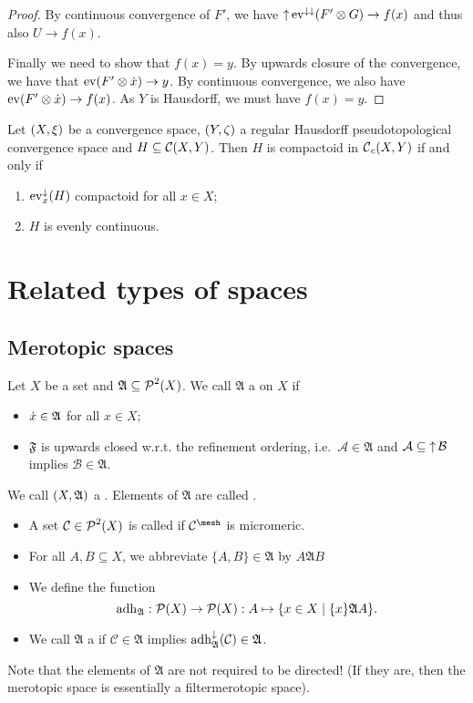 \begin{proof}
By continuous convergence of $F'$, we have $\operatorname{\uparrow}\operatorname{ev}^{\downarrow\downarrow}(F'\otimes G) \to f(x)$ and thus also $U\to f(x)$.

Finally we need to show that $f(x) = y$. By upwards closure of the convergence, we have that $\operatorname{ev}(F'\otimes \dot{x}) \to y$. By continuous convergence, we also have $\operatorname{ev}(F'\otimes \dot{x}) \to f(x)$. As $Y$ is Hausdorff, we must have $f(x) = y$.
\end{proof}

\begin{corollary}
Let $\sSet{X,\xi}$ be a convergence space, $\sSet{Y, \zeta}$ a regular Hausdorff pseudotopological convergence space and $H\subseteq \operatorname{\mathcal{C}}(X, Y)$. Then $H$ is compactoid in $\operatorname{\mathcal{C}}_c(X, Y)$ \textup{if and only if}
\begin{enumerate}
\item $\operatorname{ev}_x^\downarrow(H)$ compactoid for all $x\in X$;
\item $H$ is evenly continuous.
\end{enumerate}
\end{corollary}


\chapter{Related types of spaces}
\section{Merotopic spaces}
\begin{definition}
Let $X$ be a set and $\mathfrak{A}\subseteq \operatorname{\mathcal{P}}^2(X)$. We call $\mathfrak{A}$ a  on $X$ if
\begin{itemize}
\item $\dot{x} \in \mathfrak{A}$ for all $x\in X$;
\item $\mathfrak{F}$ is upwards closed w.r.t. the refinement ordering, i.e.\ $\mathcal{A}\in \mathfrak{A}$ and $\mathcal{A}\subseteq \operatorname{\uparrow} \mathcal{B}$ implies $\mathcal{B}\in \mathfrak{A}$.
\end{itemize}
We call $\sSet{X, \mathfrak{A}}$ a . Elements of $\mathfrak{A}$ are called .
\begin{itemize}
\item A set $\mathcal{C}\in\operatorname{\mathcal{P}}^2(X)$ is called  if $\mathcal{C}^\mesh$ is micromeric.
\item For all $A,B\subseteq X$, we abbreviate $\{A,B\}\in \mathfrak{A}$ by $A\mathfrak{A}B$
\item We define the  function
\[ \adh_\mathfrak{A}: \powerset(X)\to\powerset(X): A\mapsto \setbuilder{x\in X}{\{x\}\mathfrak{A}A}. \]
\item We call $\mathfrak{A}$ a  if $\mathcal{C}\in \mathfrak{A}$ implies $\operatorname{adh}_{\mathfrak{A}}^\downarrow(\mathcal{C}) \in \mathfrak{A}$.
\end{itemize}
\end{definition}
Note that the elements of $\mathfrak{A}$ are not required to be directed! (If they are, then the merotopic space is essentially a filtermerotopic space).

